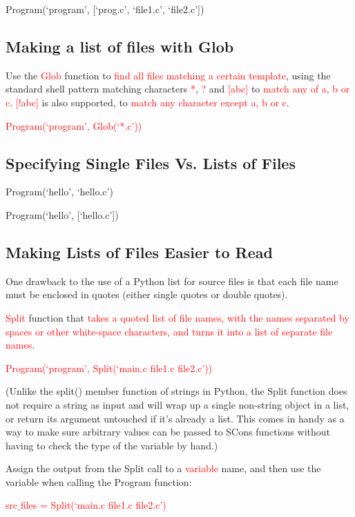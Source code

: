 \documentclass[12pt,a4paper]{article}
\begin{document}
Program(`program', [`prog.c', `file1.c', `file2.c'])


\subsection{Making a list of files with Glob}
Use the \textcolor{red}{Glob} function to \textcolor{red}{find all files matching a certain template}, using the standard shell pattern matching characters \textcolor{red}{*}, \textcolor{red}{?} and \textcolor{red}{[abc]} to \textcolor{red}{match any of a, b or c}. \textcolor{red}{[!abc]} is also supported, to \textcolor{red}{match any character except a, b or c}.


\textcolor{red}{Program(`program', Glob(`*.c'))}

\subsection{Specifying Single Files Vs. Lists of Files}
Program(`hello', `hello.c')

Program(`hello', [`hello.c'])
 
\subsection{Making Lists of Files Easier to Read}
One drawback to the use of a Python list for source files is that each file name must be enclosed in quotes (either single quotes or double quotes). 

\textcolor{red}{Split} function that \textcolor{red}{takes a quoted list of file names, with the names separated by spaces or other white-space characters, and turns it into a list of separate file names}. 

\textcolor{red}{Program(`program', Split(`main.c file1.c file2.c'))}

(Unlike the split() member function of strings in Python, the Split function does not require a string as input and will wrap up a single non-string object in a list, or return its argument untouched if it's already a list. This comes in handy as a way to make sure arbitrary values can be passed to SCons functions without having to check the type of the variable by hand.)

Assign the output from the Split call to a \textcolor{red}{variable} name, and then use the variable when calling the Program function:

\textcolor{red}{src$\_$files = Split(`main.c file1.c file2.c')}
\end{document}
